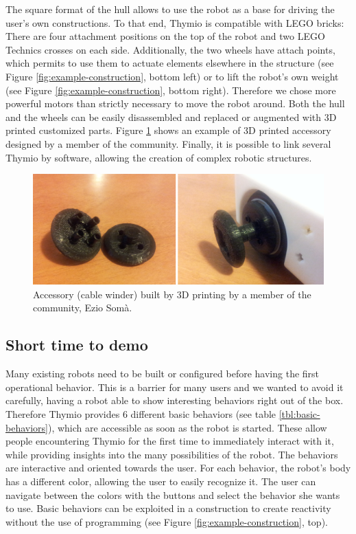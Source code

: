 \documentclass[letterpaper, 10 pt, conference]{ieeeconf}  %
\begin{document}
The square format of the hull allows to use the robot as a base for driving the user's own constructions.
To that end, Thymio is compatible with LEGO bricks:
There are four attachment positions on the top of the robot and two LEGO Technics crosses on each side.
Additionally, the two wheels have attach points, which permits to use them to actuate elements elsewhere in the structure (see Figure \ref{fig:example-construction}, bottom left) or to lift the robot's own weight (see Figure \ref{fig:example-construction}, bottom right).
Therefore we chose more powerful motors than strictly necessary to move the robot around.
Both the hull and the wheels can be easily disassembled and replaced or augmented with 3D printed customized parts.
Figure \ref{fig:3Dparts} shows an example of 3D printed accessory designed by a member of the community.
Finally, it is possible to link several Thymio by software, allowing the creation of complex robotic structures.

\begin{figure}
\centering
\includegraphics[width=.9\columnwidth]{figures/3Dparts}
\caption{Accessory (cable winder) built by 3D printing by a member of the community, Ezio Som\`a.}
\label{fig:3Dparts}
\end{figure}



\subsection{Short time to demo}
\label{sec:behaviors}

Many existing robots need to be built or configured before having the first operational behavior. 
This is a barrier for many users and we wanted to avoid it carefully, having a robot able to show interesting behaviors right out of the box.
Therefore Thymio provides 6 different basic behaviors (see table \ref{tbl:basic-behaviors}), which are accessible as soon as the robot is started.
These allow people encountering Thymio for the first time to immediately interact with it, while providing insights into the many possibilities of the robot.
The behaviors are interactive and oriented towards the user. %
For each behavior, the robot's body has a different color, allowing the user to easily recognize it.
The user can navigate between the colors with the buttons and select the behavior she wants to use.
Basic behaviors can be exploited in a construction to create reactivity without the use of programming (see Figure \ref{fig:example-construction}, top).
\end{document}
